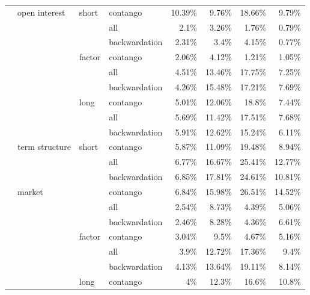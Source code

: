 \documentclass[]{elsarticle} %
\begin{document}
\begin{longtable}[t]{>{}llllrrrr}
\nopagebreak
 & \multirow[t]{-9}{*}{\raggedright\arraybackslash open interest} & \multirow[t]{-3}{*}{\raggedright\arraybackslash short} & contango & 10.39\% & 9.76\% & 18.66\% & 9.79\%\\
\nopagebreak
 &  &  & all & 2.1\% & 3.26\% & 1.76\% & 0.79\%\\
\nopagebreak
 &  &  & backwardation & 2.31\% & 3.4\% & 4.15\% & 0.77\%\\
\nopagebreak
 &  & \multirow[t]{-3}{*}{\raggedright\arraybackslash factor} & contango & 2.06\% & 4.12\% & 1.21\% & 1.05\%\\
\nopagebreak
 &  &  & all & 4.51\% & 13.46\% & 17.75\% & 7.25\%\\
\nopagebreak
 &  &  & backwardation & 4.26\% & 15.48\% & 17.21\% & 7.69\%\\
\nopagebreak
 &  & \multirow[t]{-3}{*}{\raggedright\arraybackslash long} & contango & 5.01\% & 12.06\% & 18.8\% & 7.44\%\\
\nopagebreak
 &  &  & all & 5.69\% & 11.42\% & 17.51\% & 7.68\%\\
\nopagebreak
 &  &  & backwardation & 5.91\% & 12.62\% & 15.24\% & 6.11\%\\
\nopagebreak
\multirow[t]{-30}{*}{\raggedright\arraybackslash \textbf{market}} & \multirow[t]{-9}{*}{\raggedright\arraybackslash term structure} & \multirow[t]{-3}{*}{\raggedright\arraybackslash short} & contango & 5.87\% & 11.09\% & 19.48\% & 8.94\%\\
\cmidrule{1-8}\pagebreak[0]
 &  &  & all & 6.77\% & 16.67\% & 25.41\% & 12.77\%\\
\nopagebreak
 &  &  & backwardation & 6.85\% & 17.81\% & 24.61\% & 10.81\%\\
\nopagebreak
 & \multirow[t]{-3}{*}{\raggedright\arraybackslash market} &  & contango & 6.84\% & 15.98\% & 26.51\% & 14.52\%\\
\nopagebreak
 &  &  & all & 2.54\% & 8.73\% & 4.39\% & 5.06\%\\
\nopagebreak
 &  &  & backwardation & 2.46\% & 8.28\% & 4.36\% & 6.61\%\\
\nopagebreak
 &  & \multirow[t]{-6}{*}{\raggedright\arraybackslash factor} & contango & 3.04\% & 9.5\% & 4.67\% & 5.16\%\\
\nopagebreak
 &  &  & all & 3.9\% & 12.72\% & 17.36\% & 9.4\%\\
\nopagebreak
 &  &  & backwardation & 4.13\% & 13.64\% & 19.11\% & 8.14\%\\
\nopagebreak
 &  & \multirow[t]{-3}{*}{\raggedright\arraybackslash long} & contango & 4\% & 12.3\% & 16.6\% & 10.8\%\\

\end{longtable}
\end{document}
